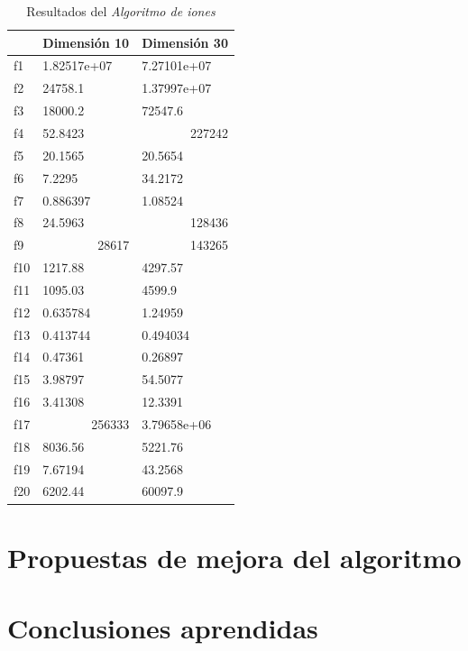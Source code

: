 \documentclass[a4paper,11pt]{article}
\begin{document}
 \begin{center}
  \begin{table}[H]	
  \caption{Resultados del \textit{Algoritmo de iones}}
  \begin{adjustbox}{width=0.5\textwidth}
    
  \begin{tabular}{|l|l|l|}
  \hline
  &  \textbf{Dimensión 10}& \textbf{Dimensión 30} \\ \hline
  f1 &  1.82517e+07 &  7.27101e+07 \\ \hline
  f2 &  24758.1 &  1.37997e+07 \\ \hline
  f3 &  18000.2 &  72547.6 \\ \hline
  f4 &  52.8423 & \multicolumn{1}{r|}{227242} \\ \hline
  f5 &  20.1565 &  20.5654 \\ \hline
  f6 &  7.2295 &  34.2172 \\ \hline
  f7 &  0.886397 &  1.08524 \\ \hline
  f8 &  24.5963 & \multicolumn{1}{r|}{128436} \\ \hline
  f9 & \multicolumn{1}{r|}{28617} & \multicolumn{1}{r|}{143265} \\ \hline
  f10 &  1217.88 &  4297.57 \\ \hline
  f11 &  1095.03 &  4599.9 \\ \hline
  f12 &  0.635784 &  1.24959 \\ \hline
  f13 &  0.413744 &  0.494034 \\ \hline
  f14 &  0.47361 &  0.26897 \\ \hline
  f15 &  3.98797 &  54.5077 \\ \hline
  f16 &  3.41308 &  12.3391 \\ \hline
  f17 & \multicolumn{1}{r|}{256333} &  3.79658e+06 \\ \hline
  f18 &  8036.56 &  5221.76 \\ \hline
  f19 &  7.67194 &  43.2568 \\ \hline
  f20 &  6202.44 &  60097.9 \\ \hline
\end{tabular}
  
  \end{adjustbox}
  \label{ion-results}
  \end{table}
  \end{center}
 


\section{Propuestas de mejora del algoritmo}
\section{Conclusiones aprendidas}
\end{document}
